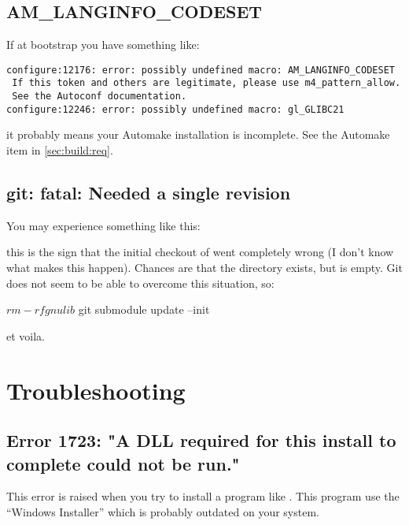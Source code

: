 \subsection{AM\_LANGINFO\_CODESET}

If at bootstrap you have something like:

\begin{lstlisting}[language={}]
configure:12176: error: possibly undefined macro: AM_LANGINFO_CODESET
 If this token and others are legitimate, please use m4_pattern_allow.
 See the Autoconf documentation.
configure:12246: error: possibly undefined macro: gl_GLIBC21
\end{lstlisting}

\noindent
it probably means your Automake installation is incomplete.  See the
Automake item in \autoref{sec:build:req}.

\subsection{git: fatal: Needed a single revision}
You may experience something like this:


\noindent
this is the sign that the initial checkout of  went
completely wrong (I don't know what makes this happen).  Chances are
that the directory exists, but is empty.  Git does not seem to be able
to overcome this situation, so:

\begin{shell}
$ rm -rf gnulib
$ git submodule update --init
\end{shell}

\noindent
et voila.



\section{Troubleshooting}

\subsection{Error 1723: "A DLL required for this install to complete could
  not be run."}

This error is raised when you try to install a program like
.  This program use the ``Windows Installer''
which is probably outdated on your system.


